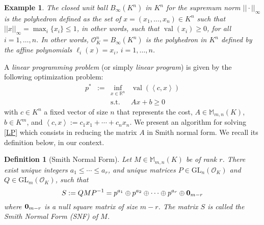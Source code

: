 \documentclass[a4paper,12pt]{article}
\newtheorem{definition}{Definition}
\newtheorem{example}{Example}
\newcommand{\R}{\mathbb{R}} %
\newcommand{\allmat}{\mathbb{M}} %
\DeclareMathOperator{\val}{val}
\newcommand{\OK}{\mathcal{O}_K}
\newcommand{\GL}{\mathrm{GL}}
\begin{document}
\begin{example}
  The closed unit ball $B_\infty(K^n)$ in $K^n$ for the supremum norm $||\cdot||_{\infty}$ is the
  polyhedron defined as the set of $x=(x_1,\ldots,x_n) \in K^n$ such that $||x||_{\infty} =
  \max_i\{x_i\} \leq 1$, in other words, such that $\val(x_i) \geq 0$, for all $i=1, \ldots, n$.
  In other words, $\OK^n = B_\infty(K^n)$ is the polyhedron in $K^n$ defined by the affine polynomials
  $\ell_i(x)=x_i$, $i=1,\ldots, n$.
\end{example}


A {\it linear programming problem} (or simply {\it linear program}) is given by the following
optimization problem:
\begin{equation}
  \tag{LP}\label{LP}
\begin{array}{rcll}
  p^* & := & \inf_{x \in \R^n} & \val(\left\langle c, x \right\rangle) \\
  &    & \text{s.t.}         & A x + b \geq 0
\end{array}
\end{equation}
with $c \in K^n$ a fixed vector of size $n$ that represents the cost, $A \in \allmat_{m,n}(K)$, $b \in K^m$,
and $\left\langle c, x \right\rangle := c_1x_1+\cdots +c_nx_n$.
We present an algorithm for solving \eqref{LP} which consists in reducing the matrix $A$ in Smith normal form.
We recall its definition below, in our context.

\begin{definition}[Smith Normal Form] \label{smith_nf}
  Let $M \in \allmat_{m,n}(K)$ be of rank $r$. There exist unique integers $a_1 \leq \cdots \leq a_r$, and
  unique matrices $P \in \GL_n(\OK)$ and $Q \in \GL_m(\OK)$, such that
  $$
  S := QMP^{-1} = p^{a_1} \oplus p^{a_2} \oplus \cdots \oplus p^{a_r} \oplus {\bf 0}_{m-r}
  $$
  where ${\bf 0}_{m-r}$ is a null square matrix of size $m-r$.
  The matrix $S$ is called the {\it Smith Normal Form (SNF)} of $M$.
\end{definition}
\end{document}
